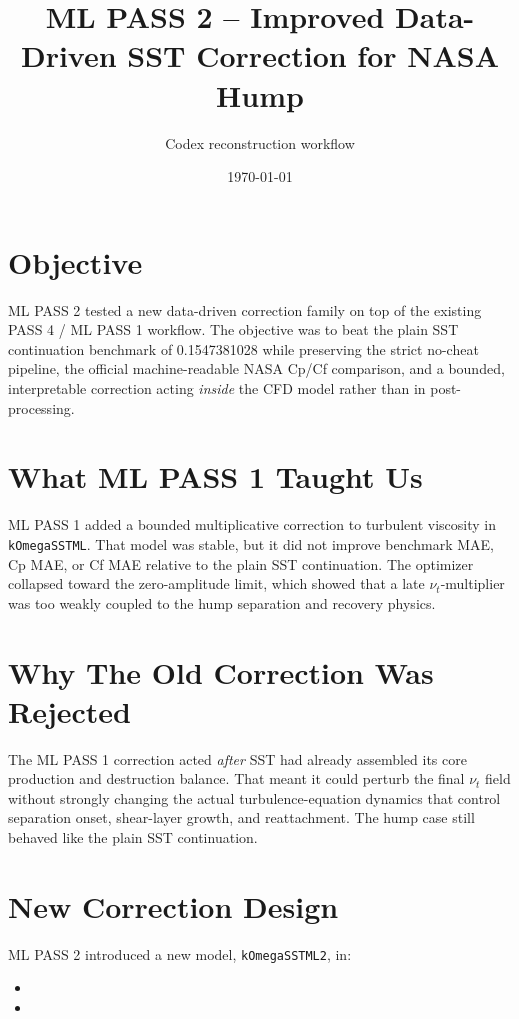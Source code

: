 \documentclass[11pt]{article}
\title{ML PASS 2 -- Improved Data-Driven SST Correction for NASA Hump}
\author{Codex reconstruction workflow}
\date{\today}
\begin{document}
\maketitle

\section{Objective}
ML PASS 2 tested a new data-driven correction family on top of the existing
PASS 4 / ML PASS 1 workflow. The objective was to beat the plain SST
continuation benchmark of \num{0.1547381028} while preserving the strict
no-cheat pipeline, the official machine-readable NASA Cp/Cf comparison, and a
bounded, interpretable correction acting \emph{inside} the CFD model rather
than in post-processing.

\section{What ML PASS 1 Taught Us}
ML PASS 1 added a bounded multiplicative correction to turbulent viscosity in
\texttt{kOmegaSSTML}. That model was stable, but it did not improve benchmark
MAE, Cp MAE, or Cf MAE relative to the plain SST continuation. The optimizer
collapsed toward the zero-amplitude limit, which showed that a late
\(\nu_t\)-multiplier was too weakly coupled to the hump separation and
recovery physics.

\section{Why The Old Correction Was Rejected}
The ML PASS 1 correction acted \emph{after} SST had already assembled its core
production and destruction balance. That meant it could perturb the final
\(\nu_t\) field without strongly changing the actual turbulence-equation
dynamics that control separation onset, shear-layer growth, and reattachment.
The hump case still behaved like the plain SST continuation.

\section{New Correction Design}
ML PASS 2 introduced a new model, \texttt{kOmegaSSTML2}, in:
\begin{itemize}[leftmargin=1.2em]
\item {}
\item {}
\end{itemize}
\end{document}

